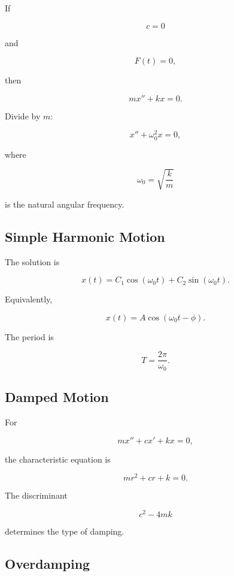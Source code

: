If

\[
c=0
\]

and

\[
F(t)=0,
\]

then

\[
\boxed{
mx''+kx=0.
}
\]

Divide by \(m\):

\[
x''
+
\omega_0^2x
=
0,
\]

where

\[
\boxed{
\omega_0
=
\sqrt{
\frac{k}{m}
}
}
\]

is the natural angular frequency.

\subsection{Simple Harmonic Motion}
\label{subsec:simple-harmonic-motion}

The solution is

\[
\boxed{
x(t)
=
C_1\cos(\omega_0t)
+
C_2\sin(\omega_0t).
}
\]

Equivalently,

\[
\boxed{
x(t)
=
A
\cos
(
\omega_0t-\phi
).
}
\]

The period is

\[
\boxed{
T
=
\frac{
2\pi
}{
\omega_0
}.
}
\]

\subsection{Damped Motion}
\label{subsec:damped-motion}

For

\[
mx''
+
cx'
+
kx
=
0,
\]

the characteristic equation is

\[
\boxed{
mr^2+cr+k=0.
}
\]

The discriminant

\[
\boxed{
c^2-4mk
}
\]

determines the type of damping.

\subsection{Overdamping}
\label{subsec:overdamping}

